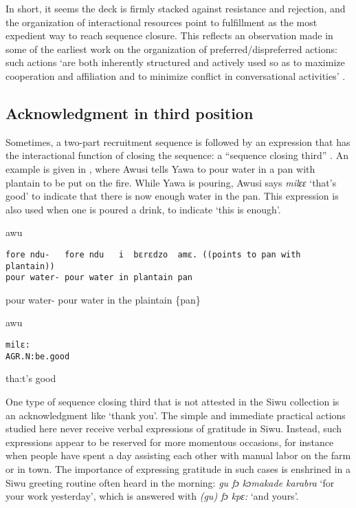 \documentclass[output=paper]{langsci/langscibook}
\begin{document}
In short, it seems the deck is firmly stacked against resistance and rejection, and the organization of interactional resources point to fulfillment as the most expedient way to reach sequence closure. This reflects an observation made in some of the earliest work on the organization of preferred/dispreferred actions: such actions ‘are both inherently structured and actively used so as to maximize cooperation and affiliation and to minimize conflict in conversational activities’ \citep[55]{atkinson_structures_1984}.

\subsection{Acknowledgment in third position}

Sometimes, a two-part recruitment sequence is followed by an expression that has the interactional function of closing the sequence: a “sequence closing third” \citep{schegloff_sequence_2007}. An example is given in , where Awusi tells Yawa to pour water in a pan with plantain to be put on the fire. While Yawa is pouring, Awusi says \textit{milɛɛ} ‘that’s good’ to indicate that there is now enough water in the pan. This expression is also used when one is poured a drink, to indicate ‘this is enough’.

\vspace{2mm}
%
\begin{transbox}{1}{awu}
\begin{verbatim}
fore ndu-   fore ndu   i  bɛrɛdzo  amɛ. ((points to pan with plantain))
pour water- pour water in plantain pan
\end{verbatim}
pour water- pour water in the plaintain \{pan\}
\end{transbox}
%
%
\begin{transbox}{3}{awu}
\begin{verbatim}
milɛ:
AGR.N:be.good
\end{verbatim}
tha:t’s good
\end{transbox}\bigskip

\normalsize
One type of sequence closing third that is not attested in the Siwu collection is an acknowledgment like ‘thank you’. The simple and immediate practical actions studied here never receive verbal expressions of gratitude in Siwu. Instead, such expressions appear to be reserved for more momentous occasions, for instance when people have spent a day assisting each other with manual labor on the farm or in town. The importance of expressing gratitude in such cases is enshrined in a Siwu greeting routine often heard in the morning: \textit{gu fɔ kɔmakade karabra} ‘for your work yesterday’, which is answered with \textit{(gu) fɔ kpɛ:} ‘and yours’.
\end{document}
